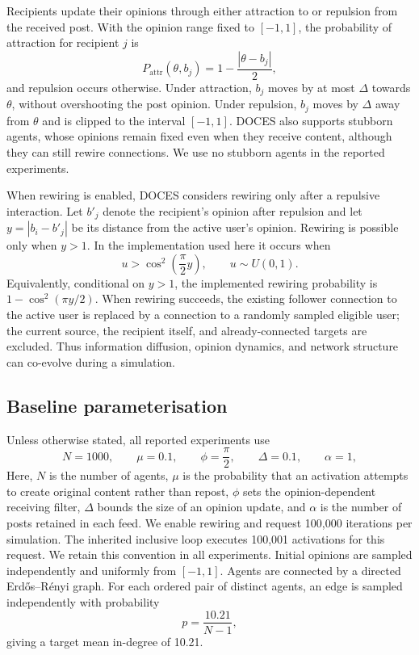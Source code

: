 \documentclass[runningheads]{llncs}
\begin{document}
Recipients update their opinions through either attraction to or repulsion from the received post. With the opinion range fixed to \([-1,1]\), the probability of attraction for recipient \(j\) is
\[
P_{\mathrm{attr}}(\theta,b_j)
    = 1-\frac{|\theta-b_j|}{2},
\]
and repulsion occurs otherwise. Under attraction, \(b_j\) moves by at most \(\Delta\) towards \(\theta\), without overshooting the post opinion. Under repulsion, \(b_j\) moves by \(\Delta\) away from \(\theta\) and is clipped to the interval \([-1,1]\). DOCES also supports stubborn agents, whose opinions remain fixed even when they receive content, although they can still rewire connections. We use no stubborn agents in the reported experiments.

When rewiring is enabled, DOCES considers rewiring only after a repulsive interaction. Let \(b'_j\) denote the recipient's opinion after repulsion and let \(y=|b_i-b'_j|\) be its distance from the active user's opinion. Rewiring is possible only when \(y>1\). In the implementation used here it occurs when
\[
u > \cos^2\left(\frac{\pi}{2}y\right),
\qquad u\sim U(0,1).
\]
Equivalently, conditional on \(y>1\), the implemented rewiring probability is \(1-\cos^2(\pi y/2)\). When rewiring succeeds, the existing follower connection to the active user is replaced by a connection to a randomly sampled eligible user; the current source, the recipient itself, and already-connected targets are excluded. Thus information diffusion, opinion dynamics, and network structure can co-evolve during a simulation.

\subsection{Baseline parameterisation}

Unless otherwise stated, all reported experiments use
\[
N=1000,\qquad
\mu=0.1,\qquad
\phi=\frac{\pi}{2},\qquad
\Delta=0.1,\qquad
\alpha=1,
\]
Here, \(N\) is the number of agents, \(\mu\) is the probability that an activation attempts to create original content rather than repost, \(\phi\) sets the opinion-dependent receiving filter, \(\Delta\) bounds the size of an opinion update, and \(\alpha\) is the number of posts retained in each feed. We enable rewiring and request 100,000 iterations per simulation. The inherited inclusive loop executes 100,001 activations for this request. We retain this convention in all experiments. Initial
opinions are sampled independently and uniformly from \([-1,1]\). Agents are
connected by a directed Erdős--Rényi graph. For each ordered pair of distinct
agents, an edge is sampled independently with probability
\[
p=\frac{10.21}{N-1},
\]
giving a target mean in-degree of 10.21.
\end{document}
